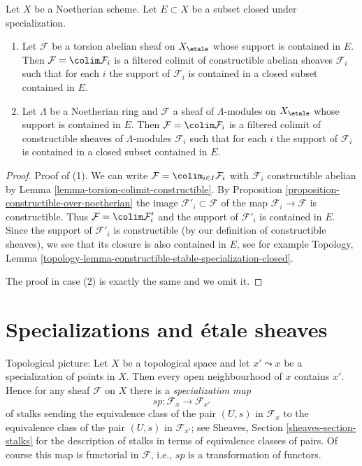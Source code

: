 \begin{lemma}
\label{lemma-support-in-subset}
Let $X$ be a Noetherian scheme. Let $E \subset X$ be a subset closed
under specialization.
\begin{enumerate}
\item Let $\mathcal{F}$ be a torsion abelian sheaf on $X_\etale$
whose support is contained in $E$. Then $\mathcal{F} = \colim \mathcal{F}_i$
is a filtered colimit of constructible abelian sheaves $\mathcal{F}_i$
such that for each $i$ the support of $\mathcal{F}_i$ is contained in
a closed subset contained in $E$.
\item Let $\Lambda$ be a Noetherian ring and $\mathcal{F}$ a sheaf
of $\Lambda$-modules on $X_\etale$ whose support is contained in $E$.
Then $\mathcal{F} = \colim \mathcal{F}_i$
is a filtered colimit of constructible sheaves of
$\Lambda$-modules $\mathcal{F}_i$ such that for each $i$
the support of $\mathcal{F}_i$ is contained in a closed subset
contained in $E$.
\end{enumerate}
\end{lemma}

\begin{proof}
Proof of (1). We can write $\mathcal{F} = \colim_{i \in I} \mathcal{F}_i$
with $\mathcal{F}_i$ constructible abelian by
Lemma \ref{lemma-torsion-colimit-constructible}.
By Proposition \ref{proposition-constructible-over-noetherian}
the image $\mathcal{F}'_i \subset \mathcal{F}$
of the map $\mathcal{F}_i \to \mathcal{F}$ is constructible.
Thus $\mathcal{F} = \colim \mathcal{F}'_i$ and the support
of $\mathcal{F}'_i$ is contained in $E$.
Since the support of $\mathcal{F}'_i$ is constructible
(by our definition of constructible sheaves), we see
that its closure is also contained in $E$, see for example
Topology, Lemma
\ref{topology-lemma-constructible-stable-specialization-closed}.

\medskip\noindent
The proof in case (2) is exactly the same and we omit it.
\end{proof}








\section{Specializations and \'etale sheaves}
\label{section-specialization}

\noindent
Topological picture: Let $X$ be a topological space and let $x' \leadsto x$
be a specialization of points in $X$. Then every open neighbourhood of $x$
contains $x'$. Hence for any sheaf $\mathcal{F}$ on $X$ there is a
{\it specialization map}
$$
sp : \mathcal{F}_x \longrightarrow \mathcal{F}_{x'}
$$
of stalks sending the equivalence class of the pair $(U, s)$ in
$\mathcal{F}_x$ to the equivalence class of the pair $(U, s)$ in
$\mathcal{F}_{x'}$; see Sheaves, Section \ref{sheaves-section-stalks}
for the description of stalks in terms of equivalence classes of pairs.
Of course this map is functorial in $\mathcal{F}$, i.e., $sp$
is a transformation of functors.

